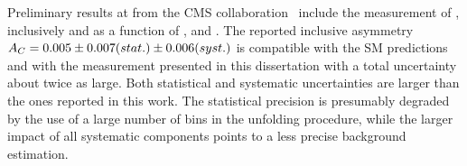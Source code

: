 Preliminary results at \eighttev{} from the CMS
collaboration~\cite{CMS-PAS-TOP-12-033} include the measurement of
\ac{}, inclusively and as a function of \mtt{}, \pttt{} and \ytt{}.
The reported inclusive asymmetry
\mbox{$A_C{}=0.005\pm0.007(stat.)\pm0.006(syst.)$} is compatible with the SM
predictions and with the measurement presented in this dissertation
with a total uncertainty about twice as large. Both
statistical and systematic uncertainties are larger than the ones
reported in this work. The statistical precision is presumably
degraded by the use of a large number of \dy{} bins in the unfolding
procedure, while the larger impact of all systematic components
points to a less precise background estimation.


